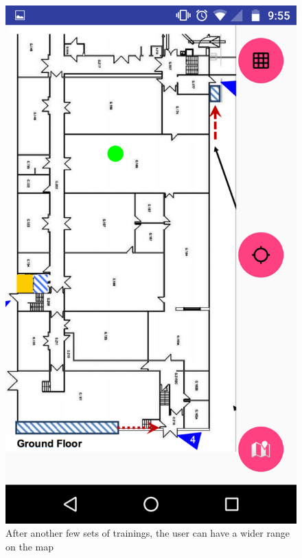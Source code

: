 \documentclass[10.8pt]{article}
\begin{document}
\begin{figure}[H]
\begin{minipage}[b]{.3\textwidth}
        \centering  
        \includegraphics[scale=1.2, width=\linewidth]{pic13.png}  
        \caption{After another few sets of trainings, the user can have a wider range on the map}  
    \end{minipage} 
    \hfill
    \begin{minipage}[b]{.3\textwidth}  
        \centering  

\end{minipage}
\end{figure}
\end{document}
